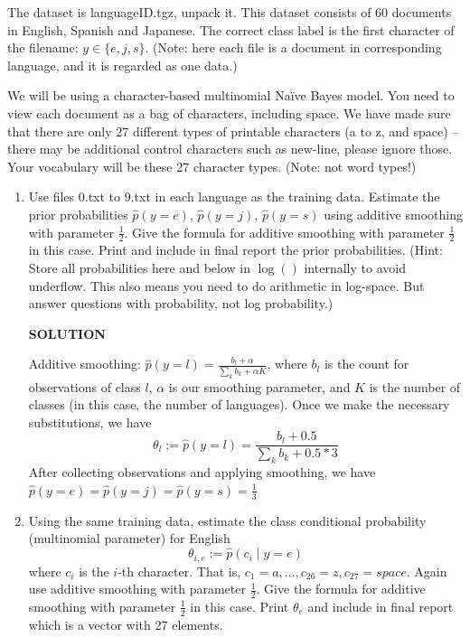 \documentclass[a4paper]{article}
\theoremstyle{definition}
\begin{document}
The dataset is languageID.tgz, unpack it.
This dataset consists of 60 documents in English, Spanish and Japanese. 
The correct class label is the first character of the filename: $y \in \{e, j, s\}$. (Note: here each file is a document in corresponding language, and it is regarded as one data.)

We will be using a character-based multinomial Naïve Bayes model.  You need to view each document as a bag of characters, including space.  We have made sure that there are only 27 different types of printable characters (a to z, and space) -- there may be additional control characters such as new-line, please ignore those.  Your vocabulary will be these 27 character types. (Note: not word types!)


\begin{enumerate}
\item
Use files 0.txt to 9.txt in each language as the training data.
Estimate the prior probabilities 
$\hat p(y=e)$,
$\hat p(y=j)$,
$\hat p(y=s)$
using additive smoothing with parameter $\frac{1}{2}$. 
Give the formula for additive smoothing with parameter $\frac{1}{2}$ in this case. 
Print and include in final report the prior probabilities.
(Hint: Store all probabilities here and below in $\log()$ internally to avoid underflow. This also means you need to do arithmetic in log-space.  But answer questions with probability, not log probability.)

\textbf{SOLUTION}

Additive smoothing: $\hat p (y = l) = \frac{b_l + \alpha}{\sum_{k}{b_k} + \alpha K}$, where $b_l$ is the count for observations of class $l$, $\alpha$ is our smoothing parameter, and $K$ is the number of classes (in this case, the number of languages). Once we make the necessary substitutions, we have
$$\theta_{l} := \hat p (y = l) = \frac{b_l + 0.5}{\sum_{k}{b_k} + 0.5 * 3}$$
After collecting observations and applying smoothing, we have $\hat p(y=e) = \hat p(y=j) = \hat p(y=s) = \frac{1}{3}$


\item
Using the same training data, estimate the class conditional probability (multinomial parameter) for English
$$\theta_{i,e} := \hat p(c_i \mid y=e)$$ 
where $c_i$ is the $i$-th character. That is, $c_1 = a, \ldots, c_{26} = z, c_{27} = space$.
Again use additive smoothing with parameter $\frac{1}{2}$.
Give the formula for additive smoothing with parameter $\frac{1}{2}$ in this case. 
Print $\theta_e$ and include in final report which is a vector with 27 elements.


\end{enumerate}
\end{document}
